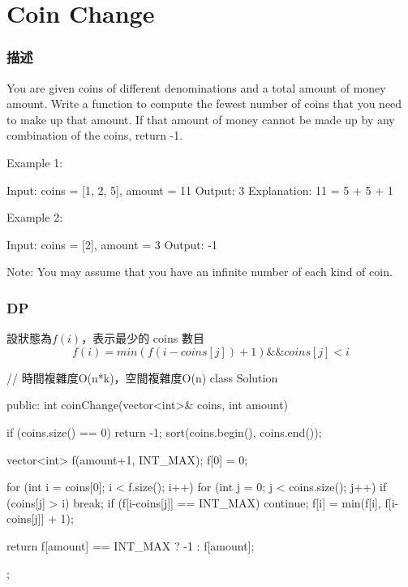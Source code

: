 \section{Coin Change} %
\label{sec:coin-change}

\subsubsection{描述}
You are given coins of different denominations and a total amount of money amount. Write a function to compute the fewest number of coins that you need to make up that amount. If that amount of money cannot be made up by any combination of the coins, return -1.

Example 1:
\begin{Code}
Input: coins = [1, 2, 5], amount = 11
Output: 3
Explanation: 11 = 5 + 5 + 1
\end{Code}

Example 2:
\begin{Code}
Input: coins = [2], amount = 3
Output: -1
\end{Code}

Note:
You may assume that you have an infinite number of each kind of coin.

\subsubsection{DP}
設狀態為$f(i)$，表示最少的 coins 數目
$$
f(i) = min(f(i-coins[j]) + 1) \&\& coins[j] < i
$$

\begin{Code}
// 時間複雜度O(n*k)，空間複雜度O(n)
class Solution {
public:
    int coinChange(vector<int>& coins, int amount) {
        if (coins.size() == 0) return -1;
        sort(coins.begin(), coins.end());

        vector<int> f(amount+1, INT_MAX);
        f[0] = 0;

        for (int i = coins[0]; i < f.size(); i++)
        {
            for (int j = 0; j < coins.size(); j++)
            {
                if (coins[j] > i) break;
                if (f[i-coins[j]] == INT_MAX) continue;
                f[i] = min(f[i], f[i-coins[j]] + 1);
            }
        }

        return f[amount] == INT_MAX ?  -1 : f[amount];
    }
};
\end{Code}

